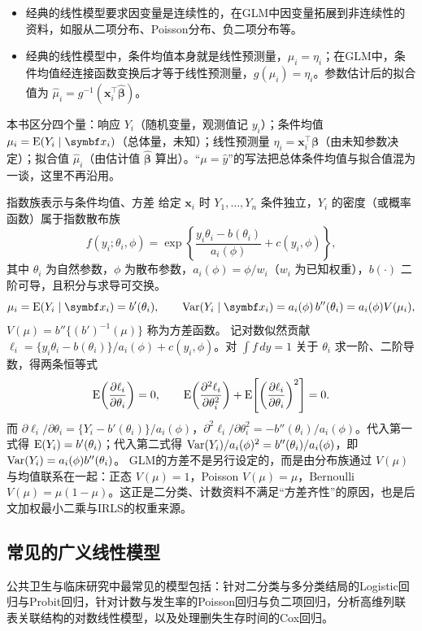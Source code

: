 \begin{itemize}
\item 经典的线性模型要求因变量是连续性的，在GLM中因变量拓展到非连续性的资料，如服从二项分布、Poisson分布、负二项分布等。
\item 经典的线性模型中，条件均值本身就是线性预测量，$\mu_i=\eta_i$；在GLM中，条件均值经连接函数变换后才等于线性预测量，$g(\mu_i)=\eta_i$。参数估计后的拟合值为 $\widehat\mu_i=g^{-1}(\bm x_i^\top\widehat{\bm\beta})$。
\end{itemize}
本书区分四个量：响应 $Y_i$（随机变量，观测值记 $y_i$）；条件均值 $\mu_i=\E(Y_i\mid\bm x_i)$（总体量，未知）；线性预测量 $\eta_i=\bm x_i^\top\bm\beta$（由未知参数决定）；拟合值 $\widehat\mu_i$（由估计值 $\widehat{\bm\beta}$ 算出）。“$\mu=\widehat y$”的写法把总体条件均值与拟合值混为一谈，这里不再沿用。
\begin{derivation}{指数族表示与条件均值、方差}
给定 $\bm x_i$ 时 $Y_1,\ldots,Y_n$ 条件独立，$Y_i$ 的密度（或概率函数）属于指数散布族
\[
f(y_i;\theta_i,\phi)=\exp\left\{\frac{y_i\theta_i-b(\theta_i)}{a_i(\phi)}+c(y_i,\phi)\right\},
\]
其中 $\theta_i$ 为自然参数，$\phi$ 为散布参数，$a_i(\phi)=\phi/w_i$（$w_i$ 为已知权重），$b(\cdot)$ 二阶可导，且积分与求导可交换。
\[
\mu_i=\E(Y_i\mid\bm x_i)=b'(\theta_i),\qquad \Var(Y_i\mid\bm x_i)=a_i(\phi)\,b''(\theta_i)=a_i(\phi)V(\mu_i),
\]
$V(\mu)=b''\{(b')^{-1}(\mu)\}$ 称为方差函数。
记对数似然贡献 $\ell_i=\{y_i\theta_i-b(\theta_i)\}/a_i(\phi)+c(y_i,\phi)$。对 $\int f\,dy=1$ 关于 $\theta_i$ 求一阶、二阶导数，得两条恒等式
\[
\operatorname{E}\!\left(\frac{\partial\ell_i}{\partial\theta_i}\right)=0,\qquad
\operatorname{E}\!\left(\frac{\partial^2\ell_i}{\partial\theta_i^2}\right)+\operatorname{E}\!\left[\left(\frac{\partial\ell_i}{\partial\theta_i}\right)^2\right]=0 .
\]
而 $\partial\ell_i/\partial\theta_i=\{Y_i-b'(\theta_i)\}/a_i(\phi)$，$\partial^2\ell_i/\partial\theta_i^2=-b''(\theta_i)/a_i(\phi)$。代入第一式得 $\operatorname{E}(Y_i)=b'(\theta_i)$；代入第二式得 $\operatorname{Var}(Y_i)/a_i(\phi)^2=b''(\theta_i)/a_i(\phi)$，即 $\operatorname{Var}(Y_i)=a_i(\phi)b''(\theta_i)$。
GLM的方差不是另行设定的，而是由分布族通过 $V(\mu)$ 与均值联系在一起：正态 $V(\mu)=1$，Poisson $V(\mu)=\mu$，Bernoulli $V(\mu)=\mu(1-\mu)$。这正是二分类、计数资料不满足“方差齐性”的原因，也是后文加权最小二乘与IRLS的权重来源。
\end{derivation}
\subsection{常见的广义线性模型}
公共卫生与临床研究中最常见的模型包括：针对二分类与多分类结局的Logistic回归与Probit回归，针对计数与发生率的Poisson回归与负二项回归，分析高维列联表关联结构的对数线性模型，以及处理删失生存时间的Cox回归。

